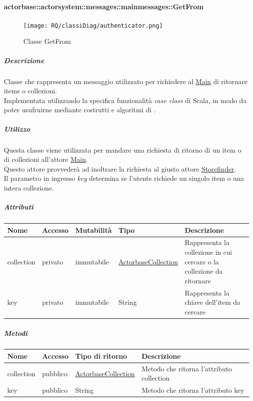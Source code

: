 \documentclass{scalatekids-article}
\begin{document}
\paragraph{actorbase::actorsystem::messages::mainmessages::GetFrom}
\label{sec:actorbase::actorsystem::messages::mainmessages::GetFrom}

\begin{figure}[H]
  \begin{center}
    \texttt{[image: RQ/classiDiag/authenticator.png]}
    \caption{Classe GetFrom}
  \end{center}
\end{figure}

\subparagraph{Descrizione}
Classe che rappresenta un messaggio utilizzato per richiedere al
\hyperref[sec:actorbase::actorsystem::actors::main::Main]{Main} di ritornare items o collezioni.\\Implementata utilizzando la specifica funzionalità \textit{case class} di Scala,
in modo da poter usufruirne mediante costrutti e algoritmi di
.

\subparagraph{Utilizzo}
Questa classe viene utilizzata per mandare una richiesta di ritorno di un item o di collezioni all'attore
\hyperref[sec:actorbase::actorsystem::actors::main::Main]{Main}.\\Questo attore
provvederà ad inoltrare la richiesta al giusto attore \hyperref[sec:actorbase::actorsystem::actors::storefinder::Storefinder]{Storefinder}.\\Il
parametro in ingresso \textit{key} determina se l'utente richiede un singolo
item o una intera collezione.

\subparagraph{Attributi}
\begin{tabular}{| p{2cm} | p{1.5cm} | p{2cm} | p{3cm} | p{8.5cm} |}
  \hline
  Nome & Accesso & Mutabilità & Tipo & Descrizione\\
  \hline
  collection & privato & immutabile & \hyperref[sec:actorbase::actorsystem::utils::ActorbaseCollection]{ActorbaseCollection} & Rappresenta la collezione in cui cercare o la collezione da ritornare \\
  \hline
  key & privato & immutabile & String & Rappresenta la chiave dell'item da cercare\\
  \hline
\end{tabular}

\subparagraph{Metodi}
\begin{tabular}{| l | l | l | l |}
  \hline
  Nome & Accesso & Tipo di ritorno & Descrizione\\
  \hline
  collection & pubblico & \hyperref[sec:actorbase::actorsystem::utils::ActorbaseCollection]{ActorbaseCollection} & Metodo che ritorna l'attributo collection\\
  \hline
  key & pubblico & String & Metodo che ritorna l'attributo key\\
  \hline
\end{tabular}
\end{document}
